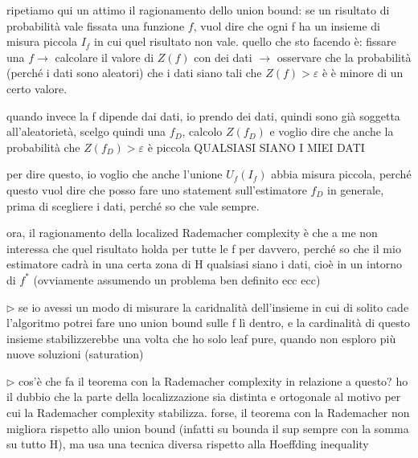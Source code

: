 \documentclass{amsart}
\begin{document}
ripetiamo qui un attimo il ragionamento dello union bound: se un risultato di probabilità vale fissata una funzione $f$, vuol dire che ogni f ha un insieme di misura piccola $I_f$ in cui quel risultato non vale. quello che sto facendo è: fissare una $f \rightarrow$ calcolare il valore di $Z(f)$ con dei dati $\rightarrow$ osservare che la probabilità (perché i dati sono aleatori) che i dati siano tali che $Z(f) > \varepsilon$ è è minore di un certo valore. 


quando invece la f dipende dai dati, io prendo dei dati, quindi sono già soggetta all'aleatorietà, scelgo quindi una $f_D$, calcolo $Z(f_D)$ e voglio dire che anche la probabilità che $Z(f_D) > \varepsilon$ è piccola QUALSIASI SIANO I MIEI DATI

per dire questo, io voglio che anche l'unione $U_f(I_f)$ abbia misura piccola, perché questo vuol dire che posso fare uno statement sull'estimatore $f_D$ in generale, prima di scegliere i dati, perché so che vale sempre. 


ora, il ragionamento della localized Rademacher complexity è che a me non interessa che quel risultato holda per tutte le f per davvero, perché so che il mio estimatore cadrà in una certa zona di H qualsiasi siano i dati, cioè in un intorno di $f^*$ (ovviamente assumendo un problema ben definito ecc ecc)

$\triangleright$ se io avessi un modo di misurare la caridnalità dell'insieme in cui di solito cade l'algoritmo potrei fare uno union bound sulle f lì dentro, e la cardinalità di questo insieme stabilizzerebbe una volta che ho solo leaf pure, quando non esploro più nuove soluzioni (saturation)


$\triangleright$ cos'è che fa il teorema con la Rademacher complexity in relazione a questo? ho il dubbio che la parte della localizzazione sia distinta e ortogonale al motivo per cui la Rademacher complexity stabilizza. forse, il teorema con la Rademacher non migliora rispetto allo union bound (infatti su bounda il sup sempre con la somma su tutto H), ma usa una tecnica diversa rispetto alla Hoeffding inequality
\end{document}
